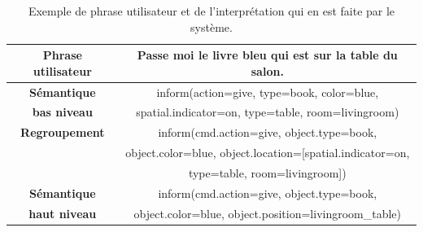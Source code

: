 \documentclass[a4paper,11pt,twoside]{StyleThese}
\begin{document}
\begin{table}
\centering
\renewcommand{\arraystretch}{1.3}
\begin{tabular}{|c|c|}
\hline
  \textbf{Phrase utilisateur} & Passe moi le livre bleu qui est sur la table du salon. \\
  \hline
  \textbf{Sémantique} & inform(action=give, type=book, color=blue, \\
  \textbf{bas niveau} & spatial.indicator=on, type=table, room=livingroom) \\
  \hline
 \textbf{Regroupement} & inform(cmd.action=give, object.type=book, \\
      & object.color=blue, object.location=[spatial.indicator=on, \\
      & type=table, room=livingroom]) \\
  \hline
  \textbf{Sémantique} & inform(cmd.action=give, object.type=book, \\
  \textbf{haut niveau} & object.color=blue, object.position=livingroom\_table) \\
  \hline
\end{tabular}
\caption{Exemple de phrase utilisateur et de l'interprétation qui en est faite par le système.}
 \label{table:fusion}
 \end{table}





\end{document}
